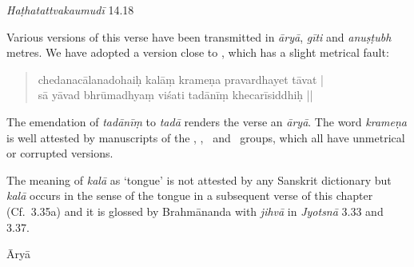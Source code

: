 \begin{ekdosis}
\begin{testimonia}[hp03_033]
\emph{Haṭhatattvakaumudī} 14.18
\begin{versinnote}
\end{versinnote}
\end{testimonia}

\begin{philcomm}[hp03_033]

Various versions of this verse have been transmitted in \emph{āryā}, \emph{gīti} and \emph{anuṣṭubh} metres. We have adopted a version close to \alphaTwo, which has a slight metrical fault:
\begin{quote}
 chedanacālanadohaiḥ kalāṃ krameṇa pravardhayet tāvat |\\
 sā yāvad bhrūmadhyaṃ viśati tadānīṃ khecarīsiddhiḥ ||
\end{quote}
The emendation of \emph{tadānīṃ} to \emph{tadā} renders the verse an \emph{āryā}. The word \emph{krameṇa} is well attested by manuscripts of the \textalpha, \textbeta, \texteta\ and  \textepsilon\ groups, which all have unmetrical or corrupted versions. 

The meaning of \emph{kalā} as `tongue' is not attested by any Sanskrit dictionary but \emph{kalā} occurs in the sense of the tongue in a subsequent verse of this chapter (Cf.~3.35a) and it is glossed by Brahmānanda with \emph{jihvā} in \emph{Jyotsnā} 3.33 and 3.37.
%
\end{philcomm}

\begin{metre}[hp03_033]
Āryā
\end{metre}


\end{ekdosis}
